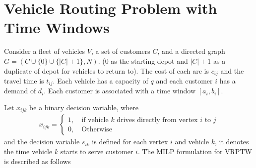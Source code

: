 


        
    \section{Vehicle Routing Problem with Time Windows}
        Consider a fleet of vehicles $V$, a set of customers $C$, and a directed graph $G = (C\cup\{0\}\cup\{|C| + 1\}, N)$. (0 as the starting depot and $|C| + 1$ as a duplicate of depot for vehicles to return to). The cost of each arc is $c_{ij}$ and the travel time is $t_{ij}$. Each vehicle has a capacity of $q$ and each customer $i$ has a demand of $d_i$. Each customer is associated with a time window $[a_i, b_i]$.

        Let $x_{ijk}$ be a binary decision variable, where
        \begin{align*}
            x_{ijk} = \begin{cases}
                1, \quad \text{if vehicle $k$ drives directly from vertex $i$ to $j$}\\
                0, \quad \text{Otherwise}
            \end{cases}
        \end{align*}
        and the decision variable $s_{ik}$ is defined for each vertex $i$ and vehicle $k$, it denotes the time vehicle $k$ starts to serve customer $i$. The MILP formulation for VRPTW is described as follows

